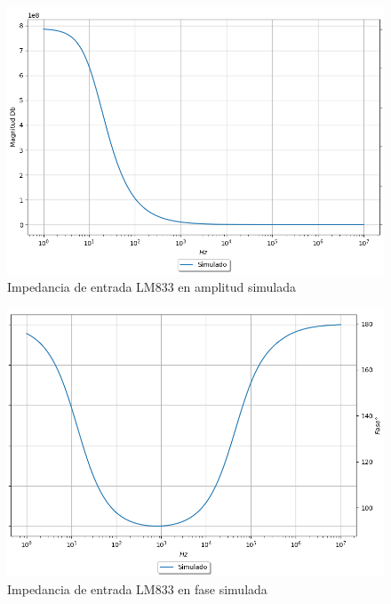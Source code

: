 \begin{figure}[H]	
	\centering
	\includegraphics[width=\textwidth]{Ejercicio2/Imagenes/Zin_A_LM833_Simulado.png}
	\caption{Impedancia de entrada LM833 en amplitud simulada}
\end{figure}

\begin{figure}[H]	
	\centering
	\includegraphics[width=\textwidth]{Ejercicio2/Imagenes/Zin_F_LM833_Simulado.png}
	\caption{Impedancia de entrada LM833 en fase simulada}
\end{figure}


